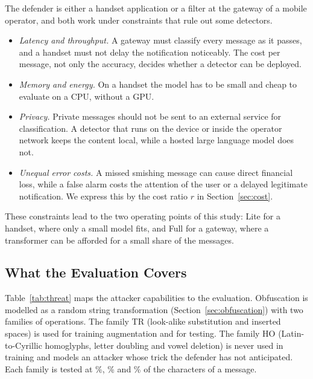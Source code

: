 The defender is either a handset application or a filter at the gateway of a mobile operator, and both work under constraints that rule out some detectors.
\begin{itemize}
\item \emph{Latency and throughput.} A gateway must classify every message as it passes, and a handset must not delay the notification noticeably. The cost per message, not only the accuracy, decides whether a detector can be deployed.
\item \emph{Memory and energy.} On a handset the model has to be small and cheap to evaluate on a CPU, without a GPU.
\item \emph{Privacy.} Private messages should not be sent to an external service for classification. A detector that runs on the device or inside the operator network keeps the content local, while a hosted large language model does not.
\item \emph{Unequal error costs.} A missed smishing message can cause direct financial loss, while a false alarm costs the attention of the user or a delayed legitimate notification. We express this by the cost ratio $r$ in Section~\ref{sec:cost}.
\end{itemize}
These constraints lead to the two operating points of this study: Lite for a handset, where only a small model fits, and Full for a gateway, where a transformer can be afforded for a small share of the messages.

\subsection{What the Evaluation Covers}\label{sec:threat-scope}

Table~\ref{tab:threat} maps the attacker capabilities to the evaluation. Obfuscation is modelled as a random string transformation (Section~\ref{sec:obfuscation}) with two families of operations. The family TR (look-alike substitution and inserted spaces) is used for training augmentation and for testing. The family HO (Latin-to-Cyrillic homoglyphs, letter doubling and vowel deletion) is never used in training and models an attacker whose trick the defender has not anticipated. Each family is tested at \%, \% and \% of the characters of a message.

